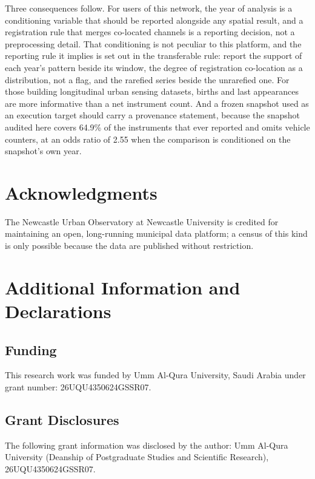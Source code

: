\documentclass[fleqn,10pt,lineno]{wlpeerj}
\newcommand{\covPct}{64.9}
\newcommand{\snapCondOR}{2.55}
\newcommand{\uquGrant}{26UQU4350624GSSR07}
\begin{document}
Three consequences follow. For users of this network, the year of analysis is a conditioning
variable that should be reported alongside any spatial result, and a registration rule that
merges co-located channels is a reporting decision, not a preprocessing detail. That
conditioning is not peculiar to this platform, and the reporting rule it implies is set out in
the transferable rule: report the support of each year's pattern beside its window, the
degree of registration co-location as a distribution, not a flag, and the rarefied series
beside the unrarefied one. For those
building longitudinal urban sensing datasets, births and last appearances are more informative
than a net instrument count. And a frozen snapshot used as an execution target should carry a
provenance statement, because the snapshot audited here covers \covPct\% of the instruments that ever
reported and omits vehicle counters, at an odds ratio of \snapCondOR{} when the comparison is
conditioned on the snapshot's own year.
















\section*{Acknowledgments}
\noindent The Newcastle Urban Observatory at Newcastle University is credited for maintaining an open, long-running municipal data platform; a census of this kind is only possible because the data are published without restriction.

\section*{Additional Information and Declarations}

\subsection*{Funding}
\noindent This research work was funded by Umm Al-Qura University, Saudi Arabia under
grant number: \uquGrant{}.

\subsection*{Grant Disclosures}
\noindent The following grant information was disclosed by the author: Umm Al-Qura University (Deanship of Postgraduate Studies and Scientific Research), 26UQU4350624GSSR07.
\end{document}
